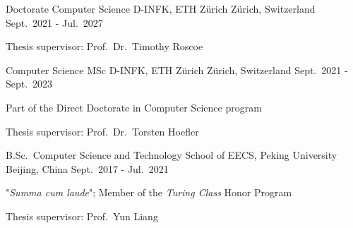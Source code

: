 

\begin{cventries}

  \cventry
    {Doctorate Computer Science} %
    {D-INFK, ETH Zürich} %
    {Zürich, Switzerland} %
    {Sept.\ 2021 - Jul.\ 2027} %
    {
      \begin{cvitems} %
      \item {Thesis supervisor: Prof.\ Dr.\ Timothy Roscoe}
      \end{cvitems}
    }

  \cventry
    {Computer Science MSc} %
    {D-INFK, ETH Zürich} %
    {Zürich, Switzerland} %
    {Sept.\ 2021 - Sept.\ 2023} %
    {
      \begin{cvitems} %
      \item {Part of the Direct Doctorate in Computer Science program}
      \item {Thesis supervisor: Prof.\ Dr.\ Torsten Hoefler}
      \end{cvitems}
    }

  \cventry
    {B.Sc.\ Computer Science and Technology} %
    {School of EECS, Peking University} %
    {Beijing, China} %
    {Sept.\ 2017 - Jul.\ 2021} %
    {
      \begin{cvitems} %
      \item {"\emph{Summa cum laude}"; Member of the \emph{Turing Class} Honor Program}
      \item {Thesis supervisor: Prof.\ Yun Liang}
      \end{cvitems}
    }

\end{cventries}
